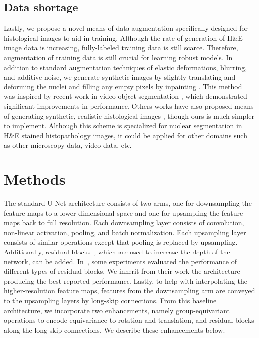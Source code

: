 \subsection{Data shortage}

Lastly, we propose a novel means of data augmentation specifically designed for histological images to aid in training. Although the rate of generation of H\&E image data is increasing, fully-labeled training data is still scarce. Therefore, augmentation of training data is still crucial for learning robust models. In addition to standard augmentation techniques of elastic deformations, blurring, and additive noise, we generate synthetic images by slightly translating and deforming the nuclei and filling any empty pixels by inpainting \cite{DBLP:journals/corr/abs-1801-07892}. This method was inspired by recent work in video object segmentation \cite{DBLP:journals/corr/KhorevaBIBS17}, which demonstrated significant improvements in performance. Others works have also proposed means of generating synthetic, realistic histological images \cite{DBLP:journals/corr/abs-1810-00236}, though ours is much simpler to implement. Although this scheme is specialized for nuclear segmentation in H\&E stained histopathology images, it could be applied for other domains such as other microscopy data, video data, etc.

\section{Methods}
\label{sec:proposed_method}
The standard U-Net architecture consists of two arms, one for downsampling the feature maps to a lower-dimensional space and one for upsampling the feature maps back to full resolution.
Each downsampling layer consists of convolution, non-linear activation, pooling, and batch normalization.
Each upsampling layer consists of similar operations except that pooling is replaced by upsampling.
Additionally, residual blocks~\cite{Resnet}, which are used to increase the depth of the network, can be added.
In~\cite{DBLP:journals/corr/HanKK16}, some experiments evaluated the performance of different types of residual blocks.
We inherit from their work the architecture producing the best reported performance. 
Lastly, to help with interpolating the higher-resolution feature maps, features from the downsampling arm are conveyed to the upsampling layers by long-skip connections.
From this baseline architecture, we incorporate two enhancements, namely group-equivariant operations to encode equivariance to rotation and translation, and residual blocks along the long-skip connections.
We describe these enhancements below.

